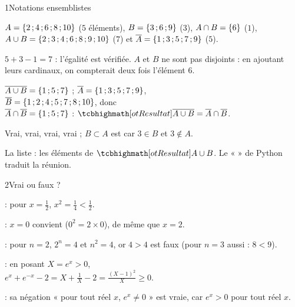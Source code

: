 

\begin{deuxcolonnes}

\begin{corrige}{1}{Notations ensemblistes}
\begin{questions}
  \item $A=\left\{2\,{;}\,4\,{;}\,6\,{;}\,8\,{;}\,10\right\}$ ($5$ éléments), $B=\left\{3\,{;}\,6\,{;}\,9\right\}$ ($3$), $A\cap B=\left\{6\right\}$ ($1$),\\
    $A\cup B=\left\{2\,{;}\,3\,{;}\,4\,{;}\,6\,{;}\,8\,{;}\,9\,{;}\,10\right\}$ ($7$) et $\overline{A}=\left\{1\,{;}\,3\,{;}\,5\,{;}\,7\,{;}\,9\right\}$ ($5$).
  \item $5+3-1=7$ : l'égalité est vérifiée. $A$ et $B$ ne sont pas disjoints : en ajoutant leurs cardinaux, on compterait
    deux fois l'élément $6$.
  \item $\overline{A\cup B}=\left\{1\,{;}\,5\,{;}\,7\right\}$ ; $\overline{A}=\left\{1\,{;}\,3\,{;}\,5\,{;}\,7\,{;}\,9\right\}$,\\
    $\overline{B}=\left\{1\,{;}\,2\,{;}\,4\,{;}\,5\,{;}\,7\,{;}\,8\,{;}\,10\right\}$, donc\\ $\overline{A}\cap\overline{B}=\left\{1\,{;}\,5\,{;}\,7\right\}$ :
    $\res{\overline{A\cup B}=\overline{A}\cap\overline{B}}$.
  \item Vrai, vrai, vrai, vrai ; $B\subset A$ est  car $3\in B$ et $3\notin A$.
  \item La liste \code{[2, 3, 4, 6, 8, 9, 10]} : les éléments de $\res{A\cup B}$. Le «  » de Python traduit la réunion.
\end{questions}
\end{corrige}

\begin{corrige}{2}{Vrai ou faux ?}
\begin{questions}
  \item {} : pour $x=\frac12$, $x^{2}=\frac14<\frac12$.
  \item {} : $x=0$ convient ($0^{2}=2\times0$), de même que $x=2$.
  \item {} : pour $n=2$, $2^{n}=4$ et $n^{2}=4$, or $4>4$ est faux (pour $n=3$ aussi : $8<9$).
  \item {} : en posant $X=e^{x}>0$,\\
    $e^{x}+e^{-x}-2=X+\frac1X-2=\frac{(X-1)^{2}}{X}\geq0$.
  \item {} : sa négation « pour tout réel $x$, $e^{x}\neq0$ » est vraie, car $e^{x}>0$ pour tout réel $x$.
\end{questions}
\end{corrige}


\end{deuxcolonnes}
